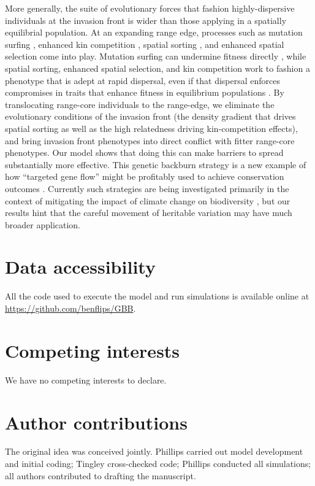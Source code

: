 \documentclass{article}
\begin{document}
More generally, the suite of evolutionary forces that fashion highly-dispersive individuals at the invasion front is wider than those applying in a spatially equilibrial population. At an expanding range edge, processes such as mutation surfing \citep{Klopfstein_Currat_Excoffier_2006, Travis_Munkemuller_Burton_Best_Dytham_Johst_2007}, enhanced kin competition \citep{Kubisch_Fronhofer_Poethke_Hovestadt_2013}, spatial sorting \citep{Shine_Brown_Phillips_2011}, and enhanced spatial selection \citep{Perkins_Phillips_Baskett_Hastings_2013} come into play.  Mutation surfing can undermine fitness directly \citep{Peischl_2015, Peischl_Dupanloup_Kirkpatrick_Excoffier_2013, Phillips_2015}, while spatial sorting, enhanced spatial selection, and kin competition work to fashion a phenotype that is adept at rapid dispersal, even if that dispersal enforces compromises in traits that enhance fitness in equilibrium populations \citep{Burton_Travis_Phillips_2010}.  By translocating range-core individuals to the range-edge, we eliminate the evolutionary conditions of the invasion front (the density gradient that drives spatial sorting as well as the high relatedness driving kin-competition effects), and bring invasion front phenotypes into direct conflict with fitter range-core phenotypes.  Our model shows that doing this can make barriers to spread substantially more effective.  This genetic backburn strategy is a new example of how ``targeted gene flow'' might be profitably used to achieve conservation outcomes \citep{Aitken_2013, Kelly2016}.  Currently such strategies are being investigated primarily in the context of mitigating the impact of climate change on biodiversity \citep{Aitken_2013, Hoffmann_Sgro_2011}, but our results hint that the careful movement of heritable variation may have much broader application.

    
\section{Data accessibility}
All the code used to execute the model and run simulations is available online at \href{https://github.com/benflips/GBB}{https://github.com/benflips/GBB}.

\section{Competing interests}
We have no competing interests to declare.

\section{Author contributions}
The original idea was conceived jointly.  Phillips carried out model development and initial coding; Tingley cross-checked code; Phillips conducted all simulations; all authors contributed to drafting the manuscript.  
\end{document}
